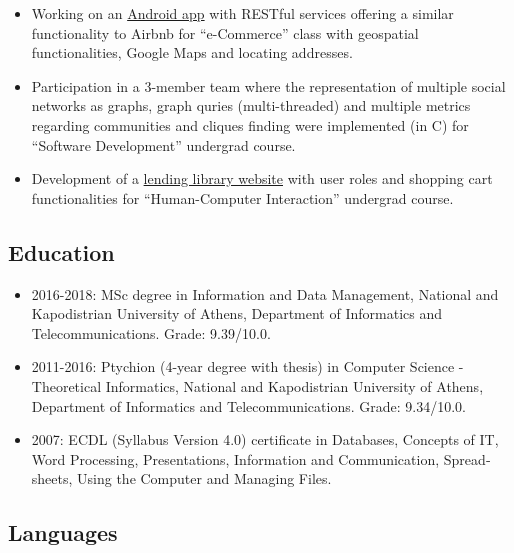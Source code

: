 \documentclass[a4paper,oneside,11pt]{article}
\begin{document}
\begin{itemize}
\begin{sloppypar}
\end{sloppypar}

\item Working on an \href{https://www.dropbox.com/sh/46dg71devshdvv1/AAAvynY_ZJJcsGwdC6ZGsQg5a?dl=0}{Android app} with RESTful services offering a similar functionality to Airbnb for ``e-Commerce'' class with geospatial functionalities, Google Maps and locating addresses.

\item Participation in a 3-member team where the representation of multiple social networks as graphs, graph quries (multi-threaded) and multiple metrics regarding communities and cliques finding were implemented (in C) for ``Software Development'' undergrad course.

\item Development of a \href{http://dl104.madgik.di.uoa.gr/eamgroup56/index.php}{lending library website} with user roles and shopping cart functionalities for ``Human-Computer Interaction'' undergrad course.

\end{itemize}

\subsection*{Education}

\begin{itemize}

\item 2016-2018: MSc degree in Information and Data Management, National and Kapodistrian University of Athens, Department of Informatics and Telecommunications. Grade: 9.39/10.0.

\item 2011-2016: Ptychion (4-year degree with thesis) in Computer Science - Theoretical Informatics, National and Kapodistrian University of Athens, Department of Informatics and Telecommunications. Grade: 9.34/10.0.

\item 2007: \textlatin{ECDL (Syllabus Version 4.0)} certificate in \textlatin{Databases, Concepts of IT, Word Processing, Presentations, Information and Communication, Spreadsheets, Using the Computer and Managing Files}.

\end{itemize}

\subsection*{Languages}
\end{document}
